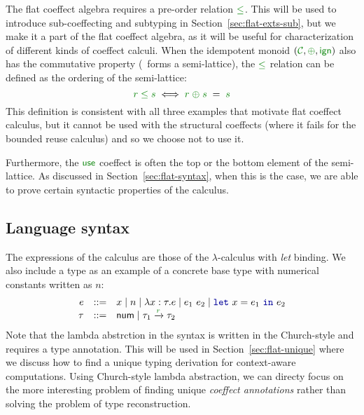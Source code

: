 The flat coeffect algebra requires a pre-order relation $\cleq$. This will be used to introduce
sub-coeffecting and subtyping in Section~\ref{sec:flat-exts-sub}, but we make it a part of the flat
coeffect algebra, as it will be useful for characterization of different kinds of coeffect calculi.
When the idempotent monoid $(\C, \cpar, \czero)$ also has the commutative property (\ie~forms a
semi-lattice), the $\cleq$ relation can be defined as the ordering of the semi-lattice:
%
\begin{equation*}
\cclrd{r} \;\cleq\; \cclrd{s} \;\Longleftrightarrow\; \cclrd{r} \;\cpar\; \cclrd{s} \;=\; \cclrd{s}
\end{equation*}
%
This definition is consistent with all three examples that motivate flat coeffect calculus, but
it cannot be used with the structural coeffects (where it fails for the bounded reuse
calculus) and so we choose not to use it.

Furthermore, the $\cunit$ coeffect is often the top or the bottom element of the semi-lattice.
As discussed in Section~\ref{sec:flat-syntax}, when this is the case, we are able to prove certain
syntactic properties of the calculus.


\subsection{Language syntax}
\label{sec:flat-calculus-syntax}

The expressions of
the calculus are those of the $\lambda$-calculus with \emph{let} binding. We also include a type
 as an example of a concrete base type with numerical constants written as $n$:
%
\begin{equation*}
\begin{array}{rcl}
e &::=& x \sep n \sep \lambda x:\tau.e \sep e_1~e_2 \sep \kvd{let}~x = e_1~\kvd{in}~e_2\\
\tau &::=& \ident{num} \sep \tau_1 \xrightarrow{\cclrd{r}} \tau_2
\end{array}
\end{equation*}
%
Note that the lambda abstrction in the syntax is written in the Church-style and requires a type
annotation. This will be used in Section~\ref{sec:flat-unique} where we discuss how to find a
unique typing derivation for context-aware computations. Using Church-style lambda abstraction,
we can directy focus on the more interesting problem of finding unique \emph{coeffect annotations}
rather than solving the problem of type reconstruction.

